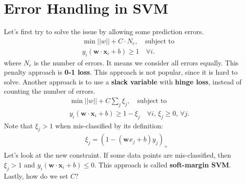 \section{Error Handling in SVM}
Let's first try to solve the issue by allowing some prediction errors. 
\begin{align*}
	&\min ||w||+C\cdot N_{e},\quad \textrm{subject to } \\
	&y_i(\mathbf{w}\cdot \mathbf{x}_i+b)\geq 1 \quad \forall i.
\end{align*}
where $N_e$ is the number of errors. It means we consider all errors equally. This penalty approach is \textbf{0-1 loss}. This approach is not popular, since it is hard to solve. Another approach is to use a \textbf{slack variable} with \textbf{hinge loss}, instead of counting the number of errors. 
\begin{align*}
	&\min ||w||+C\sum_j\xi_j ,\quad \textrm{subject to } \\
	&y_i(\mathbf{w}\cdot \mathbf{x}_i+b)\geq 1-\xi_j \quad \forall i,\, \xi_j\geq 0,\, \forall j.
\end{align*}
Note that $\xi_j>1$ when mis-classified by its definition: 
\begin{align*}
	\xi_j = (1-(\mathbf{w}x_j+b)y_j)_+
\end{align*}
Let's look at the new constraint. If some data points are mis-classified, then $\xi_j>1$ and $y_i(\mathbf{w}\cdot \mathbf{x}_i+b)\leq 0$. This approach is called \textbf{soft-margin SVM}. Lastly, how do we set $C$?














